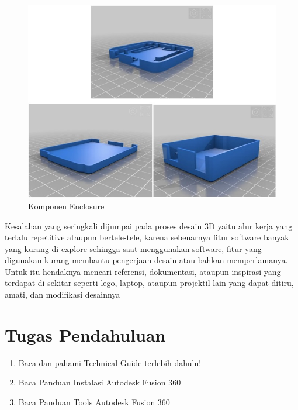     \begin{figure}[H]
        \centering
        \includegraphics[width=1\linewidth]{P3/img/image2.jpg}
        \caption{Komponen Enclosure}
        \label{fig:Komponen Enclosure}
    \end{figure}

Kesalahan yang seringkali dijumpai pada proses desain 3D yaitu alur kerja yang terlalu repetitive ataupun
bertele-tele, karena sebenarnya fitur software banyak yang kurang di-explore sehingga saat
menggunakan software, fitur yang digunakan kurang membantu pengerjaan desain atau bahkan
memperlamanya. Untuk itu hendaknya mencari referensi, dokumentasi, ataupun inspirasi yang terdapat
di sekitar seperti lego, laptop, ataupun projektil lain yang dapat ditiru, amati, dan modifikasi desainnya


\section{Tugas Pendahuluan}
\begin{enumerate}
    \item Baca dan pahami Technical Guide terlebih dahulu!
    \item Baca Panduan Instalasi Autodesk Fusion 360
    \item Baca Panduan Tools Autodesk Fusion 360
\end{enumerate}

